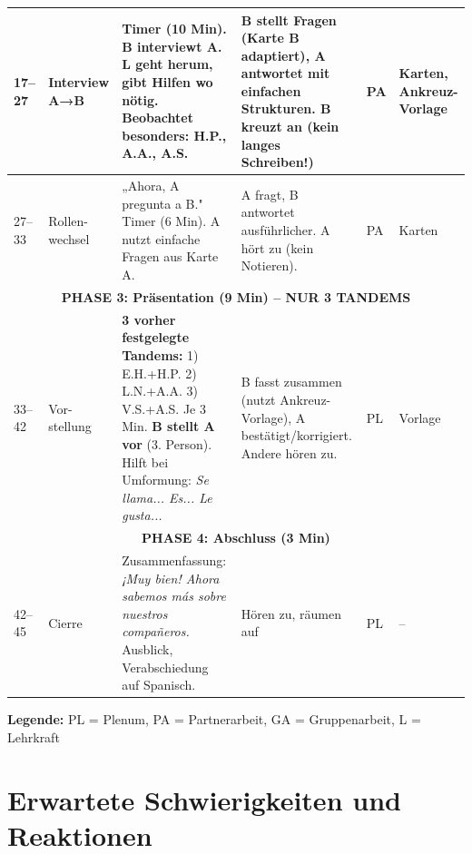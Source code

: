 \documentclass[11pt, a4paper]{article}
\newcommand{\es}[1]{\textcolor{spanisch}{\textit{#1}}}
\begin{document}
\begin{longtable}{|p{1.2cm}|p{2cm}|p{4cm}|p{3.5cm}|p{1.5cm}|p{1.5cm}|}
    17--27 & Interview A→B & Timer (10 Min). \textbf{B interviewt A}. L geht herum, gibt Hilfen wo nötig. \textbf{Beobachtet besonders: H.P., A.A., A.S.} & B stellt Fragen (Karte B adaptiert), A antwortet mit einfachen Strukturen. \textbf{B kreuzt an} (kein langes Schreiben!) & PA & Karten, Ankreuz-Vorlage \\
    \hline

    27--33 & Rollen-wechsel & „Ahora, A pregunta a B." Timer (6 Min). A nutzt einfache Fragen aus Karte A. & A fragt, B antwortet ausführlicher. A hört zu (kein Notieren). & PA & Karten \\
    \hline

    \multicolumn{6}{|c|}{\cellcolor{hellgrau}\textbf{PHASE 3: Präsentation (9 Min) -- NUR 3 TANDEMS}} \\
    \hline

    33--42 & Vor-stellung & \textbf{3 vorher festgelegte Tandems:} 1) E.H.+H.P. 2) L.N.+A.A. 3) V.S.+A.S. Je 3 Min. \textbf{B stellt A vor} (3. Person). Hilft bei Umformung: \es{Se llama... Es... Le gusta...} & B fasst zusammen (nutzt Ankreuz-Vorlage), A bestätigt/korrigiert. Andere hören zu. & PL & Vorlage \\
    \hline

    \multicolumn{6}{|c|}{\cellcolor{hellgrau}\textbf{PHASE 4: Abschluss (3 Min)}} \\
    \hline

    42--45 & Cierre & Zusammenfassung: \es{¡Muy bien! Ahora sabemos más sobre nuestros compañeros.} Ausblick, Verabschiedung auf Spanisch. & Hören zu, räumen auf & PL & -- \\
    \hline

\end{longtable}

\textbf{Legende:} PL = Plenum, PA = Partnerarbeit, GA = Gruppenarbeit, L = Lehrkraft


\section{Erwartete Schwierigkeiten und Reaktionen}
\end{document}
